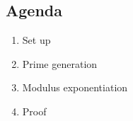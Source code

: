 

\subsection{Agenda}
\begin{enumerate}
\item Set up
\item Prime generation
\item Modulus exponentiation
\item Proof
\end{enumerate}
